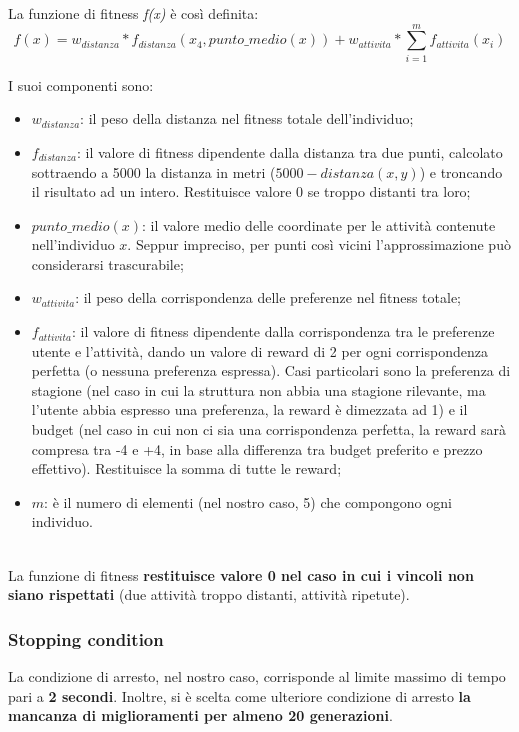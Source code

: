 \documentclass{CSUniSchoolLabReport}
\begin{document}
La funzione di fitness \textit{f(x)} è così definita: \\

$$f(x) = w_{distanza} * f_{distanza}(x_4, punto\_medio(x)) + w_{attivita} * \sum_{i=1}^{m} f_{attivita}(x_i)$$

I suoi componenti sono:
\begin{itemize}
    \item $w_{distanza}$: il peso della distanza nel fitness totale dell'individuo;
    \item $f_{distanza}$: il valore di fitness dipendente dalla distanza tra due punti, calcolato sottraendo a 5000 la distanza in metri ($5000 - distanza(x, y)$) e troncando il risultato ad un intero. Restituisce valore 0 se troppo distanti tra loro;
    \item $punto\_medio(x)$: il valore medio delle coordinate per le attività contenute nell'individuo $x$. Seppur impreciso, per punti così vicini l'approssimazione può considerarsi trascurabile;
    \item $w_{attivita}$: il peso della corrispondenza delle preferenze nel fitness totale;
    \item $f_{attivita}$: il valore di fitness dipendente dalla corrispondenza tra le preferenze utente e l'attività, dando un valore di reward di 2 per ogni corrispondenza perfetta (o nessuna preferenza espressa). Casi particolari sono la preferenza di stagione (nel caso in cui la struttura non abbia una stagione rilevante, ma l'utente abbia espresso una preferenza, la reward è dimezzata ad 1) e il budget (nel caso in cui non ci sia una corrispondenza perfetta, la reward sarà compresa tra -4 e +4, in base alla differenza tra budget preferito e prezzo effettivo). Restituisce la somma di tutte le reward;
    \item $m$: è il numero di elementi (nel nostro caso, 5) che compongono ogni individuo.
\end{itemize}
~\\
La funzione di fitness \textbf{restituisce valore 0 nel caso in cui i vincoli non siano rispettati} (due attività troppo distanti, attività ripetute).


\subsubsection{Stopping condition}

La condizione di arresto, nel nostro caso, corrisponde al limite massimo di tempo pari a \textbf{2 secondi}.
Inoltre, si è scelta come ulteriore condizione di arresto \textbf{la mancanza di miglioramenti per almeno 20 generazioni}.
\end{document}
